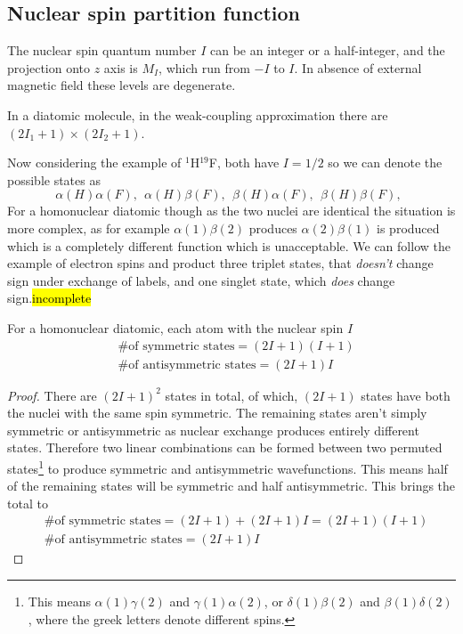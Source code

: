 \subsection{Nuclear spin partition function}
The nuclear spin quantum number $I$ can be an integer or a half-integer, and the projection onto $z$ axis is $M_I$, which run from $-I$ to $I$. In absence of external magnetic field these levels are degenerate.\par
In a diatomic molecule, in the weak-coupling approximation there are $(2I_1+1)\times(2I_2+1) $.\par
Now considering the example of $^1$H$^{19}$F, both have $I=1/2$ so we can denote the possible states as
\begin{equation}
\alpha(H)\alpha(F),\ \ \alpha(H)\beta(F),\ \ \beta(H)\alpha(F),\ \ \beta(H)\beta(F),\ \ 
\end{equation}
For a homonuclear diatomic though as the two nuclei are identical the situation is more complex, as for example $\alpha(1)\beta(2)$ produces $\alpha(2)\beta(1)$ is produced which is a completely different function which is unacceptable. We can follow the example of electron spins and product three triplet states, that \emph{doesn't} change sign under exchange of labels, and one singlet state, which \emph{does} change sign.\hl{incomplete}\par
\begin{thrm}
For a homonuclear diatomic, each atom with the nuclear spin $I$
\begin{equation}
\begin{aligned}
&\text{\# of symmetric states}=(2I+1)(I+1)\\
&\text{\# of antisymmetric states}=(2I+1)I
\end{aligned}
\end{equation}
\end{thrm}
\begin{proof}
There are $(2I+1)^2$ states in total, of which, $(2I+1)$ states have both the nuclei with the same spin \ie symmetric. The remaining states aren't simply symmetric or antisymmetric as nuclear exchange produces entirely different states. Therefore two linear combinations can be formed between two permuted states\footnote{This means $\alpha(1)\gamma(2) $ and $\gamma(1)\alpha(2) $, or $\delta(1)\beta(2) $ and $\beta(1)\delta(2)$, where the greek letters denote different spins.} to produce symmetric and antisymmetric wavefunctions. This means half of the remaining states will be symmetric and half antisymmetric. This brings the total to
\begin{equation}
\begin{aligned}
&\text{\# of symmetric states}=(2I+1)+(2I+1)I=(2I+1)(I+1)\\
&\text{\# of antisymmetric states}=(2I+1)I
\end{aligned}
\end{equation}
\end{proof}
